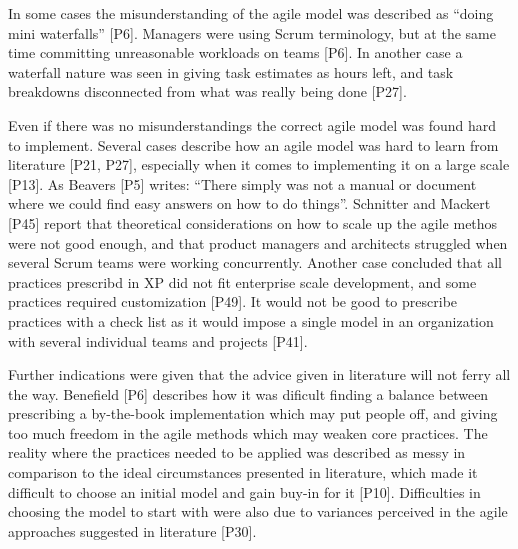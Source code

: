 \documentclass[preprint,authoryear,12pt]{elsarticle}
\begin{document}
In some cases the misunderstanding of the agile model was described as ``doing
mini waterfalls'' [P6]. Managers were using Scrum terminology, but at the same
time committing unreasonable workloads on teams [P6]. In another case a
waterfall nature was seen in giving task estimates as hours left, and task
breakdowns disconnected from what was really being done [P27].


Even if there was no misunderstandings the correct agile model was found hard to
implement. Several cases describe how an agile model was hard to learn from
literature [P21, P27], especially when it comes to implementing it on a large
scale [P13]. As Beavers [P5] writes: ``There simply was not a manual or document
where we could find easy answers on how to do things''.
Schnitter and Mackert [P45] report that theoretical considerations on how to
scale up the agile methos were not good enough, and that product managers and
architects struggled when several Scrum teams were working concurrently.
Another case concluded that all practices prescribd in XP did not fit enterprise
scale development, and some practices required customization [P49]. It would not
be good to prescribe practices with a check list as it would impose a single
model in an organization with several individual teams and projects [P41].

Further indications were given that the advice given in literature will not
ferry all the way. Benefield [P6] describes how it was dificult finding a
balance between prescribing a by-the-book implementation which may put people
off, and giving too much freedom in the agile methods which may weaken core
practices.
The reality where the practices needed to be applied was described as
messy in comparison to the ideal circumstances presented in literature, which
made it difficult to choose an initial model and gain buy-in for it [P10].
Difficulties in choosing the model to start with were also due to variances
perceived in the agile approaches suggested in literature [P30].

\end{document}
